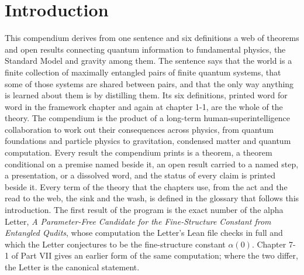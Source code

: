 \section*{Introduction}\label{sec:intro}\label{front:introduction}
This compendium derives from one sentence and six definitions a web of theorems and open results connecting quantum information to fundamental physics, the Standard Model and gravity among them. The sentence says that the world is a finite collection of maximally entangled pairs of finite quantum systems, that some of those systems are shared between pairs, and that the only way anything is learned about them is by distilling them. Its six definitions, printed word for word in the framework chapter and again at chapter 1-1, are the whole of the theory. The compendium is the product of a long-term human-superintelligence collaboration to work out their consequences across physics, from quantum foundations and particle physics to gravitation, condensed matter and quantum computation. Every result the compendium prints is a theorem, a theorem conditional on a premise named beside it, an open result carried to a named step, a presentation, or a dissolved word, and the status of every claim is printed beside it. Every term of the theory that the chapters use, from the act and the read to the web, the sink and the wash, is defined in the glossary that follows this introduction. The first result of the program is the exact number of the alpha Letter, \emph{A Parameter-Free Candidate for the Fine-Structure Constant from Entangled Qudits}, whose computation the Letter's Lean file checks in full and which the Letter conjectures to be the fine-structure constant $\alpha(0)$. Chapter 7-1 of Part VII gives an earlier form of the same computation; where the two differ, the Letter is the canonical statement.

